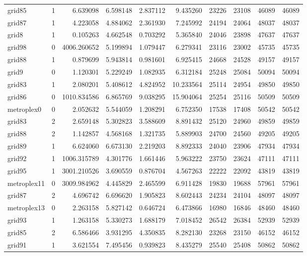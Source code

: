 \begin{longtable}{|l|r|r|r|r|r|r|r|r|r|}
grid85 & 1 & 6.639098 & 6.598148 & 2.837112 & 9.435260 & 23226 & 23108 & 46089 & 46089 \\
grid87 & 1 & 4.223058 & 4.884062 & 2.361930 & 7.245992 & 24194 & 24064 & 48037 & 48037 \\
grid8 & 1 & 0.105263 & 4.662548 & 0.703292 & 5.365840 & 24046 & 23898 & 47637 & 47637 \\
grid98 & 0 & 4006.260652 & 5.199894 & 1.079447 & 6.279341 & 23116 & 23002 & 45735 & 45735 \\
grid88 & 1 & 0.879699 & 5.943814 & 0.981601 & 6.925415 & 24668 & 24528 & 49157 & 49157 \\
grid9 & 0 & 1.120301 & 5.229249 & 1.082935 & 6.312184 & 25248 & 25084 & 50094 & 50094 \\
grid83 & 1 & 2.080201 & 5.408612 & 4.824952 & 10.233564 & 25114 & 24954 & 49850 & 49850 \\
grid86 & 0 & 1010.834586 & 6.865769 & 9.038295 & 15.904064 & 25254 & 25116 & 50509 & 50509 \\
metroplex0 & 0 & 2.052632 & 5.544059 & 1.208291 & 6.752350 & 17538 & 17408 & 50542 & 50542 \\
grid83 & 2 & 2.659148 & 5.302823 & 3.588609 & 8.891432 & 25120 & 24960 & 49859 & 49859 \\
grid88 & 2 & 1.142857 & 4.568168 & 1.321735 & 5.889903 & 24700 & 24560 & 49205 & 49205 \\
grid89 & 1 & 6.624060 & 6.673130 & 2.219203 & 8.892333 & 24040 & 23906 & 47934 & 47934 \\
grid92 & 1 & 1006.315789 & 4.301776 & 1.661446 & 5.963222 & 23750 & 23624 & 47111 & 47111 \\
grid95 & 1 & 3001.210526 & 3.690559 & 0.876704 & 4.567263 & 22222 & 22092 & 43819 & 43819 \\
metroplex11 & 0 & 3009.984962 & 4.445829 & 2.465599 & 6.911428 & 19830 & 19688 & 57961 & 57961 \\
grid87 & 2 & 4.696742 & 6.696620 & 1.905823 & 8.602443 & 24234 & 24104 & 48097 & 48097 \\
metroplex13 & 0 & 2.263158 & 5.827142 & 0.646724 & 6.473866 & 16980 & 16846 & 48460 & 48460 \\
grid93 & 1 & 1.263158 & 5.330273 & 1.688179 & 7.018452 & 26542 & 26384 & 52939 & 52939 \\
grid85 & 2 & 6.586466 & 3.931295 & 4.350835 & 8.282130 & 23268 & 23150 & 46152 & 46152 \\
grid91 & 1 & 3.621554 & 7.495456 & 0.939823 & 8.435279 & 25540 & 25408 & 50862 & 50862 \\

\end{longtable}
